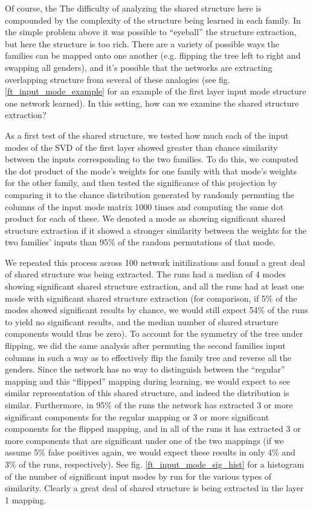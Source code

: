\documentclass[10pt,letterpaper]{article}
\begin{document}
Of course, the %
The difficulty of analyzing the shared structure here is compounded by the complexity of the structure being learned in each family. In the simple problem above it was possible to ``eyeball'' the structure extraction, but here the structure is too rich. There are a variety of possible ways the families can be mapped onto one another (e.g. flipping the tree left to right and swapping all genders), and it's possible that the networks are extracting overlapping structure from several of these analogies (see fig. \ref{ft_input_mode_example} for an example of the first layer input mode structure one network learned). In this setting, how can we examine the shared structure extraction? \par
As a first test of the shared structure, we tested how much each of the input modes of the SVD of the first layer showed greater than chance similarity between the inputs corresponding to the two families. To do this, we computed the dot product of the mode's weights for one family with that mode's weights for the other family, and then tested the significance of this projection by comparing it to the chance distribution generated by randomly permuting the columns of the input mode matrix 1000 times and computing the same dot product for each of these. We denoted a mode as showing significant shared structure extraction if it showed a stronger similarity between the weights for the two families' inputs than 95\% of the random permutations of that mode. \par
We repeated this process across 100 network initilizations and found a great deal of shared structure was being extracted. The runs had a median of 4 modes showing significant shared structure extraction, and all the runs had at least one mode with significant shared structure extraction (for comparison, if 5\% of the modes showed significant results by chance, we would still expect 54\% of the runs to yield no significant results, and the median number of shared structure components would thus be zero). To account for the symmetry of the tree under flipping, we did the same analysis after permuting the second families input columns in such a way as to effectively flip the family tree and reverse all the genders. Since the network has no way to distinguish between the ``regular'' mapping and this ``flipped'' mapping during learning, we would expect to see similar representation of this shared structure, and indeed the distribution is similar. Furthermore, in 95\% of the runs the network has extracted 3 or more significant components for the regular mapping or 3 or more significant components for the flipped mapping, and in all of the runs it has extracted 3 or more components that are significant under one of the two mappings (if we assume 5\% false positives again, we would expect these results in only 4\% and 3\% of the runs, respectively). See fig. \ref{ft_input_mode_sig_hist} for a histogram of the number of significant input modes by run for the various types of similarity. Clearly a great deal of shared structure is being extracted in the layer 1 mapping. \par
\end{document}
